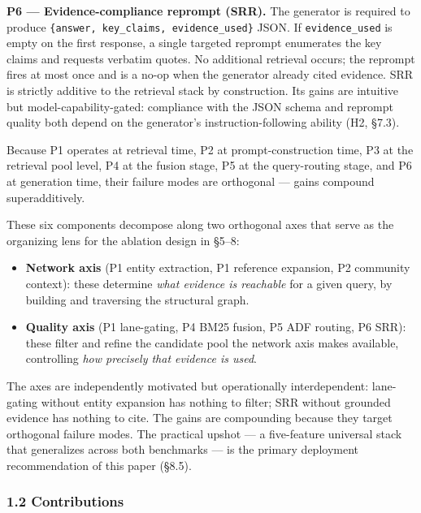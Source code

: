 \textbf{P6 --- Evidence-compliance reprompt (SRR).} The generator is required to produce \texttt{\{answer,\ key\_claims,\ evidence\_used\}} JSON. If \texttt{evidence\_used} is empty on the first response, a single targeted reprompt enumerates the key claims and requests verbatim quotes. No additional retrieval occurs; the reprompt fires at most once and is a no-op when the generator already cited evidence. SRR is strictly additive to the retrieval stack by construction. Its gains are intuitive but model-capability-gated: compliance with the JSON schema and reprompt quality both depend on the generator's instruction-following ability (H2, §7.3).

Because P1 operates at retrieval time, P2 at prompt-construction time, P3 at the retrieval pool level, P4 at the fusion stage, P5 at the query-routing stage, and P6 at generation time, their failure modes are orthogonal --- gains compound superadditively.

These six components decompose along two orthogonal axes that serve as the organizing lens for the ablation design in §5--8:

\begin{itemize}
\tightlist
\item
  \textbf{Network axis} (P1 entity extraction, P1 reference expansion, P2 community context): these determine \emph{what evidence is reachable} for a given query, by building and traversing the structural graph.
\item
  \textbf{Quality axis} (P1 lane-gating, P4 BM25 fusion, P5 ADF routing, P6 SRR): these filter and refine the candidate pool the network axis makes available, controlling \emph{how precisely that evidence is used}.
\end{itemize}

The axes are independently motivated but operationally interdependent: lane-gating without entity expansion has nothing to filter; SRR without grounded evidence has nothing to cite. The gains are compounding because they target orthogonal failure modes. The practical upshot --- a five-feature universal stack that generalizes across both benchmarks --- is the primary deployment recommendation of this paper (§8.5).

\subsubsection{1.2 Contributions}\label{contributions}


